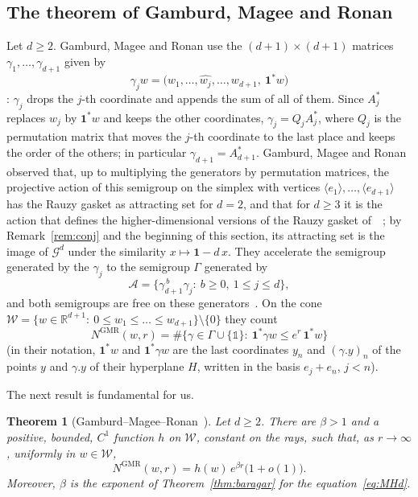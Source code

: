 \documentclass[11pt]{amsart}
\newcommand{\id}{\mathds{1}}
\newtheorem{lettertheorem}{Theorem}%
\theoremstyle{definition}
\theoremstyle{remark}
\newcommand{\one}{\mathbf 1}
\newcommand{\R}{\mathbb R}
\newcommand{\pr}[1]{\langle #1\rangle}
\begin{document}
\subsection*{The theorem of Gamburd, Magee and Ronan}
Let $d\ge2$. 
Gamburd, Magee and Ronan use the $(d+1)\times(d+1)$ matrices $\gamma_1,\dots,\gamma_{d+1}$ given by
\[
  \gamma_jw=\bigl(w_1,\dots,\widehat{w_j},\dots,w_{d+1},\ \one^*w\bigr)
\]
\cite[(1.4) and Example~9]{GMR19}: $\gamma_j$ drops the $j$-th coordinate and appends the sum of all of them. 
Since $A_j^*$ replaces $w_j$ by $\one^*w$ and keeps the other coordinates, $\gamma_j=Q_jA_j^*$, where $Q_j$ is the permutation matrix that moves the $j$-th coordinate to the last place and keeps the order of the others; in particular $\gamma_{d+1}=A_{d+1}^*$. 
Gamburd, Magee and Ronan observed that, up to multiplying the generators by permutation matrices, the projective action of this semigroup on the simplex with vertices $\pr{e_1},\dots,\pr{e_{d+1}}$ has the Rauzy gasket as attracting set for $d=2$, and that for $d\ge3$ it is the action that defines the higher-dimensional versions of the Rauzy gasket of~\cite{DL08,AS13}~\cite[\S1, after Example~9]{GMR19}; by Remark~\ref{rem:conj} and the beginning of this section, its attracting set is the image of $\mathcal G^d$ under the similarity $x\mapsto\one-d\,x$. 
They accelerate the semigroup generated by the $\gamma_j$ to the semigroup $\Gamma$ generated by
\[
  \mathcal A=\bigl\{\gamma_{d+1}^{\,b}\gamma_j:\ b\ge0,\ 1\le j\le d\bigr\},
\]
and both semigroups are free on these generators~\cite[p.~756]{GMR19}. On the cone $\mathcal W=\{w\in\R^{d+1}:\ 0\le w_1\le\dots\le w_{d+1}\}\setminus\{0\}$ they count
\[
  N^{\mathrm{GMR}}(w,r)=\#\bigl\{\gamma\in\Gamma\cup\{\id\}:\ \one^*\gamma w\le e^r\,\one^*w\bigr\}
\]
\cite[(1.7)]{GMR19} (in their notation, $\one^*w$ and $\one^*\gamma w$ are the last coordinates $y_n$ and $(\gamma.y)_n$ of the points $y$ and $\gamma.y$ of their hyperplane $H$, written in the basis $e_j+e_n$, $j<n$).

The next result is fundamental for us.

\begin{lettertheorem}[Gamburd--Magee--Ronan~{\cite[Thm.~13]{GMR19}}]
\label{thm:GMR}
    Let $d\ge2$. 
    There are $\beta>1$ and a positive, bounded, $C^1$ function $h$ on $\mathcal W$, constant on the rays, such that, as $r\to\infty$, uniformly in $w\in\mathcal W$,
\[
N^{\mathrm{GMR}}(w,r)=h(w)\,e^{\beta r}\bigl(1+o(1)\bigr).
\]
    Moreover, $\beta$ is the exponent of Theorem~\ref{thm:baragar} for the equation~\eqref{eq:MHd}.
\end{lettertheorem}
\end{document}
